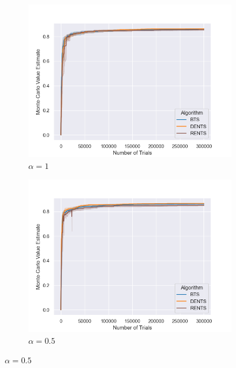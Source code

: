             \begin{figure}
                \centering
                
                \begin{subfigure}[b]{0.32\textwidth}
                    \centering
                    \includegraphics[width=\textwidth]{figures/temp/fl_sens/053_fl8_1_0_02.png}
                    \caption{$\alpha=1$}
                \end{subfigure}
                \begin{subfigure}[b]{0.32\textwidth}
                    \centering
                    \includegraphics[width=\textwidth]{figures/temp/fl_sens/054_fl8_0_5_02.png}
                    \caption{$\alpha=0.5$}

\end{subfigure}
\end{figure}

